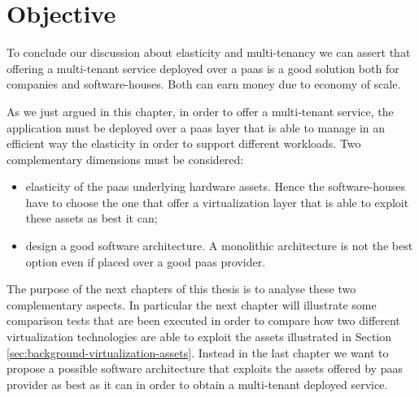 %
%
\section{Objective}
\label{sec:elasticity-objective}
To conclude our discussion about elasticity and multi-tenancy we can assert that offering a multi-tenant
service deployed over a \ac{paas} is a good solution both for companies and software-houses. Both can
earn money due to economy of scale.

As we just argued in this chapter, in order to offer a multi-tenant service, the application must be
deployed over a \ac{paas} layer that is able to manage in an efficient way the elasticity in order to
support different workloads. Two complementary dimensions must be considered:

\begin{itemize}
	\item{elasticity of the \ac{paas} underlying hardware assets. Hence the software-houses have to
		choose the one that offer a virtualization layer that is able to exploit these assets as best it
		can;}
	\item{design a good software architecture. A monolithic architecture is not the best option even if
		placed over a good \ac{paas} provider.}
\end{itemize}

The purpose of the next chapters of this thesis is to analyse these two complementary aspects. In particular
the next chapter will illustrate some comparison tests that are been executed in order to compare how two
different virtualization technologies are able to exploit the assets illustrated in Section
\ref{sec:background-virtualization-assets}. Instead in the last chapter we want to propose a possible
software architecture that exploits the assets offered by \ac{paas} provider as best as it can
in order to obtain a multi-tenant deployed service.